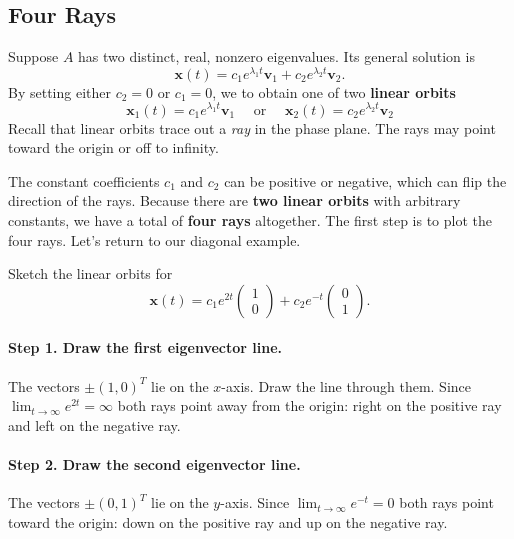 \documentclass[11pt,letterpaper]{article}
\newcommand{\phaseaxes}{%
    \draw[->,gray](-3.25,0)--(3.45,0)node[right]{$x$};
    \draw[->,gray](0,-3.25)--(0,3.45)node[above]{$y$};
}
\newcommand{\saddlerays}{%
    \draw[outward](-3.1,0)--(3.1,0);
    \draw[inward](0,-3.1)--(0,3.1);
    \foreach \s in {-1,1}{
        \draw[->,outward](.9*\s,0)--(1.7*\s,0);
        \draw[->,inward](0,1.7*\s)--(0,.9*\s);
    }
    \fill(0,0)circle(2pt);
}
\begin{document}
\subsection{Four Rays}
Suppose $A$ has two distinct, real, nonzero eigenvalues. Its general solution is
\[
\mathbf{x}(t)=c_1e^{\lambda_1t}\mathbf v_1+c_2e^{\lambda_2t}\mathbf v_2.
\]
By setting either $c_2=0$ or $c_1=0$, we to obtain one of two \textbf{linear orbits}
$$
\mathbf{x}_1(t)=c_1e^{\lambda_1t}\mathbf v_1 \quad\text{ or }\quad 
\mathbf{x}_2(t)=c_2e^{\lambda_2t}\mathbf v_2
$$
Recall that linear orbits trace out a \textit{ray} in the phase plane. The rays may point toward the origin or off to infinity.

The constant coefficients $c_1$ and $c_2$ can be positive or negative, which can flip the direction of the rays. 
Because there are \textbf{two linear orbits} with arbitrary constants, we have a total of \textbf{four rays} altogether. The first step is to plot the four rays. Let's return to our diagonal example.

\begin{example}[2]{
Sketch the linear orbits for 
\[
\mathbf{x}(t)=c_1e^{2t}\begin{pmatrix}1\\0\end{pmatrix}
+c_2e^{-t}\begin{pmatrix}0\\1\end{pmatrix}.
\]
}
\paragraph{Step 1. Draw the first eigenvector line.}
The vectors $\pm(1,0)^T$ lie on the $x$-axis. Draw the line through them.
Since 
$\lim_{t\to\infty} e^{2t}=\infty$
both rays point away from the origin: right on the positive ray and left on the negative ray.

\paragraph{Step 2. Draw the second eigenvector line.}
The vectors $\pm(0,1)^T$ lie on the $y$-axis. Since
$\lim_{t\to\infty} e^{-t}=0$
both rays point toward the origin: down on the positive ray and up on the negative ray.

\begin{center}
\end{center}
\end{example}
\end{document}
